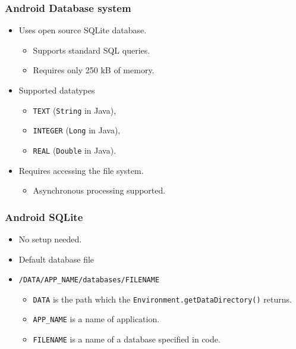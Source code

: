 \documentclass[10pt,xcolor=pdflatex]{beamer}
\begin{document}
\begin{frame}[fragile]\frametitle{Android Database system}
\begin{itemize}
	\item Uses open source SQLite database.
	  \begin{itemize}
		\item Supports standard SQL queries.
		\item Requires only 250 kB of memory.
	  \end{itemize}
    \item Supported datatypes
	  \begin{itemize}
		\item \texttt{TEXT} (\texttt{String} in Java),
		\item \texttt{INTEGER} (\texttt{Long} in Java),
		\item \texttt{REAL} (\texttt{Double} in Java).
	  \end{itemize}
    \item Requires accessing the file system.
	  \begin{itemize}
	 	\item Asynchronous processing supported.
	  \end{itemize}
\end{itemize}
\end{frame}


\begin{frame}[fragile]\frametitle{Android SQLite}
\begin{itemize}
  \item No setup needed.
  \item Default database file
  \item[] \texttt{/DATA/APP\_NAME/databases/FILENAME}
    \begin{itemize}
	  \item \texttt{DATA} is the path which the \texttt{Environment.getDataDirectory()} returns.
	  \item \texttt{APP\_NAME} is a name of application.
	  \item \texttt{FILENAME} is a name of a database specified in code.
    \end{itemize}
\end{itemize}
\end{frame}
\end{document}
